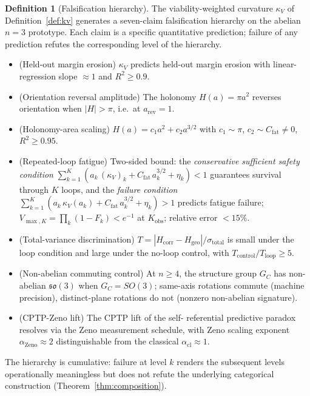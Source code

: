 \documentclass[11pt,a4paper]{article}
\theoremstyle{plain}
\theoremstyle{definition}
\newtheorem{definition}[theorem]{Definition}
\theoremstyle{remark}
\newcommand{\kk}{\kappa_{\!V}}
\newcommand{\so}{\mathfrak{so}}
\begin{document}
\begin{definition}[Falsification hierarchy]
\label{def:hierarchy}
The viability-weighted curvature $\kk$ of
Definition~\ref{def:kv} generates
a seven-claim falsification
hierarchy on the abelian $n=3$ prototype. Each claim is a
specific quantitative prediction; failure of any prediction refutes
the corresponding level of the hierarchy.
\begin{itemize}[leftmargin=1.2em,itemsep=2pt]
\item[\textbf{A.}] (Held-out margin erosion) $\kk$ predicts held-out
margin erosion with linear-regression slope $\approx 1$ and $R^2\geq 0.9$.
\item[\textbf{B.}] (Orientation reversal amplitude) The holonomy
$H(a)=\pi a^2$ reverses orientation when $|H|>\pi$, i.e.\ at
$a_{\mathrm{rev}}=1$.
\item[\textbf{C.}] (Holonomy-area scaling) $H(a) = c_1 a^2 + c_2
a^{3/2}$ with $c_1\sim\pi$, $c_2\sim C_{\mathrm{fat}}\neq 0$, $R^2\geq
0.95$.
\item[\textbf{D.}] (Repeated-loop fatigue) Two-sided bound: the
\emph{conservative sufficient safety condition} $\sum_{k=1}^{K}(a_k\,
(\kk)_k + C_{\mathrm{fat}}\,a_k^{3/2} + \eta_k) < 1$ guarantees survival
through $K$ loops, and the \emph{failure condition}
$\sum_{k=1}^{K}(a_k\,\kk(a_k) + C_{\mathrm{fat}}\,a_k^{3/2} + \eta_k) > 1$
predicts fatigue failure; $V_{\max,K}=\prod_k(1-F_k)<e^{-1}$ at
$K_{\mathrm{obs}}$; relative error $<15\%$.
\item[\textbf{E.}] (Total-variance discrimination) $T =
|H_{\mathrm{corr}}-H_{\mathrm{geo}}|/\sigma_{\mathrm{total}}$ is small
under the loop condition and large under the no-loop control, with
$T_{\mathrm{control}}/T_{\mathrm{loop}}\geq 5$.
\item[\textbf{F.}] (Non-abelian commuting control) At $n\geq 4$, the
structure group $G_C$ has non-abelian $\so(3)$ when $G_C = SO(3)$; same-axis
rotations commute (machine precision), distinct-plane rotations do not
(nonzero non-abelian signature).
\item[\textbf{G.}] (CPTP-Zeno lift) The CPTP lift of the self-
referential predictive paradox resolves via the Zeno measurement
schedule, with Zeno scaling exponent $\alpha_{\mathrm{Zeno}}\approx 2$
distinguishable from the classical $\alpha_{\mathrm{cl}}\approx 1$.
\end{itemize}
\end{definition}

The hierarchy is cumulative: failure at level $k$ renders the
subsequent levels operationally meaningless but does not refute the
underlying categorical construction (Theorem~\ref{thm:composition}).
\end{document}
